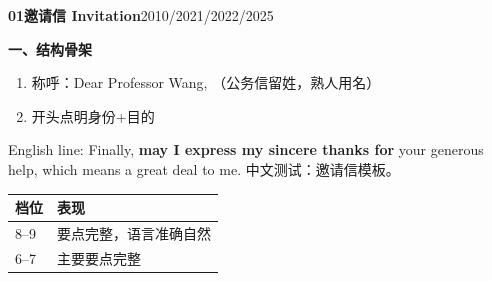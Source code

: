 \documentclass[10pt,a4paper]{ctexart}
\begin{document}
\noindent\colorbox{soft}{\parbox{\dimexpr\linewidth-2\fboxsep}{{\color{accent}\bfseries 01\quad 邀请信 Invitation}\hfill {\small\color{gray}2010/2021/2022/2025}}}
\vspace{6pt}

{\color{accent}\bfseries 一、结构骨架}

\begin{enumerate}[leftmargin=1.2em,itemsep=2pt]
\item 称呼：Dear Professor Wang, （公务信留姓，熟人用名）
\item 开头点明身份+目的
\end{enumerate}

English line: Finally, \textbf{may I express my sincere thanks for} your generous help, which means a great deal to me. \quad 中文测试：邀请信模板。

\begin{tabularx}{\linewidth}{@{}lX@{}}
\toprule
档位 & 表现 \\
\midrule
8--9 & 要点完整，语言准确自然 \\
6--7 & 主要要点完整 \\
\bottomrule
\end{tabularx}
\end{document}
